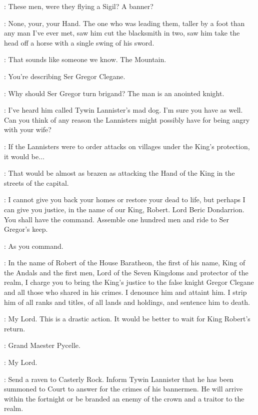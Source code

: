 \NED: These men, were they flying a Sigil? A banner?

\SOUTHERNFARMER: None, your, your Hand. The one who was leading them, taller by a foot than any man I've ever met, saw him cut the blacksmith in two, saw him take the head off a horse with a single swing of his sword. 

\LITTLEFINGER:  That sounds like someone we know. The Mountain. 

\NED:  You're describing Ser Gregor Clegane. 

\PYCELLE: Why should Ser Gregor turn brigand? The man is an anointed knight. 

\LITTLEFINGER: I've heard him called Tywin Lannister's mad dog. I'm sure you have as well.  Can you think of any reason the Lannisters might possibly have for being angry with your wife?

\PYCELLE: If the Lannisters were to order attacks on villages under the King's protection, it would be$\ldots$ 

\LITTLEFINGER: That would be almost as brazen as attacking the Hand of the King in the streets of the capital. 

\NED: I cannot give you back your homes or restore your dead to life, but perhaps I can give you justice, in the name of our King, Robert. Lord Beric Dondarrion. You shall have the command. Assemble one hundred men and ride to Ser Gregor's keep.

\BERIC: As you command. 


\NED: In the name of Robert of the House Baratheon, the first of his name, King of the Andals and the first men, Lord of the Seven Kingdoms and protector of the realm, I charge you to bring the King's justice to the false knight Gregor Clegane and all those who shared in his crimes. I denounce him and attaint him. I strip him of all ranks and titles, of all lands and holdings, and sentence him to death.

\PYCELLE: My Lord. This is a drastic action. It would be better to wait for King Robert's return.

\NED: Grand Maester Pycelle. 

\PYCELLE: My Lord. 

\NED: Send a raven to Casterly Rock. Inform Tywin Lannister that he has been summoned to Court to answer for the crimes of his bannermen. He will arrive within the fortnight or be branded an enemy of the crown and a traitor to the realm. 


